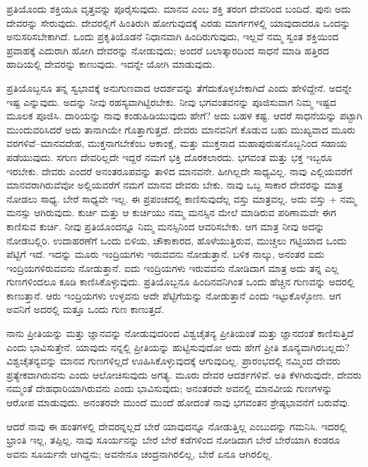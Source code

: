 ಪ್ರತಿಯೊಂದು ಶಕ್ತಿಯೂ ವೃತ್ತವನ್ನು ಪೂರೈಸುವುದು. ಮಾನವ ಎಂಬ ಶಕ್ತಿ ತರಂಗ ದೇವರಿಂದ ಬಂದಿದೆ. ಪುನಃ ಅದು ದೇವರನ್ನು ಸೇರುವುದು. ದೇವರಲ್ಲಿಗೆ ಹಿಂತಿರುಗಿ ಹೋಗುವುದಕ್ಕೆ ಎರಡು ಮಾರ್ಗಗಳಲ್ಲಿ ಯಾವುದಾದರೂ ಒಂದನ್ನು ಅನುಸರಿಸಬೇಕಾಗಿದೆ. ಒಂದು ಪ್ರಕೃತಿಯೊಡನೆ ನಿಧಾನವಾಗಿ ಹಿಂದಿರುಗುವುದು, ಇಲ್ಲವೆ ನಮ್ಮ ಸ್ವಂತ ಶಕ್ತಿಯಿಂದ ಪ್ರವಾಹಕ್ಕೆ ಎದುರಾಗಿ ಹೋಗಿ ದೇವರನ್ನು ನೋಡುವುದು; ಅಂದರೆ ಬಲಾತ್ಕಾರದಿಂದ ಸಾಧನೆ ಮಾಡಿ ಹತ್ತಿರದ ಹಾದಿಯಲ್ಲಿ ದೇವರನ್ನು ಕಾಣುವುದು. ಇದನ್ನೇ ಯೋಗಿ ಮಾಡುವುದು.

ಪ್ರತಿಯೊಬ್ಬನೂ ತನ್ನ ಸ್ವಭಾವಕ್ಕೆ ಅನುಗುಣವಾದ ಆದರ್ಶವನ್ನು ತೆಗೆದುಕೊಳ್ಳಬೇಕಾಗಿದೆ ಎಂದು ಹೇಳಿದ್ದೇನೆ. ಅದನ್ನೇ ಇಷ್ಟ ಎನ್ನುವುದು. ಅದನ್ನು ನೀವು ರಹಸ್ಯವಾಗಿಟ್ಟಿರಬೇಕು. ನೀವು ಭಗವಂತವನನ್ನು ಪೂಜಿಸುವಾಗ ನಿಮ್ಮ ಇಷ್ಟದ ಮೂಲಕ ಪೂಜಿಸಿ. ದಾರಿಯನ್ನು ನಾವು ಕಂಡುಹಿಡಿಯುವುದು ಹೇಗೆ? ಅದು ಬಹಳ ಕಷ್ಟ. ಆದರೆ ಸಾಧನೆಯನ್ನು ಪಟ್ಟಾಗಿ ಮುಂದುವರಿಸಿದರೆ ಅದು ತಾನಾಗಿಯೇ ಗೊತ್ತಾಗುತ್ತದೆ. ದೇವರು ಮಾನವನಿಗೆ ಕೊಡುವ ಬಹು ಮುಖ್ಯವಾದ ಮೂರು ವರಗಳಿವೆ–ಮಾನವದೇಹ, ಮುಕ್ತನಾಗಬೇಕೆಂಬ ಆಕಾಂಕ್ಷೆ, ಮತ್ತು ಮುಕ್ತನಾದ ಮಹಾಪುರುಷನೊಬ್ಬನಿಂದ ಸಹಾಯ ಪಡೆಯುವುದು. ಸಗುಣ ದೇವರಿಲ್ಲದೇ ಇದ್ದರೆ ನಮಗೆ ಭಕ್ತಿ ದೊರಕಲಾರದು. ಭಗವಂತ ಮತ್ತು ಭಕ್ತ ಇಬ್ಬರೂ ಇರಬೇಕು. ದೇವರು ಎಂದರೆ ಅನಂತರೂಪವನ್ನು ತಾಳಿದ ಮಾನವನೇ. ಹೀಗಿಲ್ಲದೇ ಸಾಧ್ಯವಿಲ್ಲ. ನಾವು ಎಲ್ಲಿಯವರೆಗೆ ಮಾನವರಾಗಿರುವೆವೋ ಅಲ್ಲಿಯವರೆಗೆ ನಮಗೆ ಮಾನವ ದೇವರು ಬೇಕು. ನಾವು ಒಬ್ಬ ಸಾಕಾರ ದೇವರನ್ನು ಮಾತ್ರ ನೋಡಲು ಸಾಧ್ಯ. ಬೇರೆ ಸಾಧ್ಯವೇ ಇಲ್ಲ. ಈ ಪ್ರಪಂಚದಲ್ಲಿ ಕಾಣಿಸುವುದೆಲ್ಲ ವಸ್ತು ಮಾತ್ರವಲ್ಲ. ಅದು ವಸ್ತು + ನಮ್ಮ ಮನಸ್ಸು ಆಗಿರುವುದು. ಕುರ್ಚಿ ಮತ್ತು ಆ ಕುರ್ಚಿಯು ನಮ್ಮ ಮನಸ್ಸಿನ ಮೇಲೆ ಮಾಡಿರುವ ಪರಿಣಾಮವೇ ಈಗ ಕಾಣಿಸುವ ಕುರ್ಚಿ. ನೀವು ಪ್ರತಿಯೊಂದನ್ನೂ ನಿಮ್ಮ ಮನಸ್ಸಿನಿಂದ ಆವರಿಸಬೇಕು. ಆಗ ಮಾತ್ರ ನೀವು ಅದನ್ನು ನೋಡಬಲ್ಲಿರಿ. ಉದಾಹರಣೆಗೆ ಒಂದು ಬಿಳಿಯ, ಚೌಕಾಕಾರದ, ಹೊಳೆಯುತ್ತಿರುವ, ಮುಚ್ಚಲು ಗಟ್ಟಿಯಾದ ಒಂದು ಪೆಟ್ಟಿಗೆ ಇದೆ. ಇದನ್ನು ಮೂರು ಇಂದ್ರಿಯಗಳು ಇರುವವನು ನೋಡುತ್ತಾನೆ. ಬಳಿಕ ನಾಲ್ಕು, ಅನಂತರ ಐದು ಇಂದ್ರಿಯಗಳಿರುವವನು ನೋಡುತ್ತಾನೆ. ಐದು ಇಂದ್ರಿಯಗಳು ಇರುವವನು ನೋಡಿದಾಗ ಮಾತ್ರ ಅದು ತನ್ನ ಎಲ್ಲ ಗುಣಗಳಿಂದಲೂ ಕೂಡಿ ಕಾಣಿಸಿಕೊಳ್ಳುವುದು. ಪ್ರತಿಯೊಬ್ಬನೂ ಹಿಂದಿನವನಿಗಿಂತ ಒಂದು ಹೆಚ್ಚಿನ ಗುಣವನ್ನು ಅದರಲ್ಲಿ ಕಾಣುತ್ತಾನೆ. ಆರು ಇಂದ್ರಿಯಗಳು ಉಳ್ಳವನು ಅದೇ ಪೆಟ್ಟಿಗೆಯನ್ನು ನೋಡುತ್ತಾನೆ ಎಂದು ಇಟ್ಟುಕೊಳ್ಳೋಣ. ಆಗ ಅವನಿಗೆ ಅದರಲ್ಲಿ ಮತ್ತೂ ಒಂದು ಗುಣ ಕಾಣುತ್ತದೆ.

ನಾನು ಪ್ರೀತಿಯನ್ನು ಮತ್ತು ಜ್ಞಾನವನ್ನು ನೋಡುವುದರಿಂದ ವಿಶ್ವಚೈತನ್ಯ ಪ್ರೀತಿಯಂತೆ ಮತ್ತು ಜ್ಞಾನದಂತೆ ಕಾಣಿಸುತ್ತಿದೆ ಎಂದು ಭಾವಿಸುತ್ತೇನೆ. ಯಾವುದು ನನ್ನಲ್ಲಿ ಪ್ರೀತಿಯನ್ನು ಹುಟ್ಟಿಸುವುದೋ ಅದು ಹೇಗೆ ಪ್ರೀತಿ ಶೂನ್ಯವಾಗಿರಬಲ್ಲದು? ವಿಶ್ವಚೈತನ್ಯವನ್ನು ಮಾನವ ಗುಣಗಳಿಲ್ಲದೆ ಊಹಿಸಿಕೊಳ್ಳುವುದಕ್ಕೆ ಆಗುವುದಿಲ್ಲ. ಪ್ರಾರಂಭದಲ್ಲಿ ನಮ್ಮಿಂದ ದೇವರು ಪ್ರತ್ಯೇಕವಾಗಿರುವನು ಎಂದು ಆಲೋಚಿಸುವುದು ಅಗತ್ಯ. ಮೂರು ದೇವರ ಆದರ್ಶಗಳಿವೆ. ಅತಿ ಕೆಳಗಿರುವುದೇ, ದೇವರು ನಮ್ಮಂತೆ ದೇಹಧಾರಿಯಾಗಿರುವನು ಎಂದು ಭಾವಿಸುವುದು; ಅನಂತರವೇ ಅವನಲ್ಲಿ ಮಾನವೀಯ ಗುಣಗಳನ್ನು ಆರೋಪ ಮಾಡುವುದು. ಅನಂತರವೇ ಮುಂದೆ ಮುಂದೆ ಹೋದಂತೆ ನಾವು ಭಗವಂತನ ಶ್ರೇಷ್ಠಭಾವನೆಗೆ ಬರುವೆವು.

ಆದರೆ ನಾವು ಈ ಹಂತಗಳಲ್ಲಿ ದೇವರನ್ನಲ್ಲದೆ ಬೇರೆ ಯಾವುದನ್ನೂ ನೋಡುತ್ತಿಲ್ಲ ಎಂಬುದನ್ನು ಗಮನಿಸಿ. ಇದರಲ್ಲಿ ಭ್ರಾಂತಿ ಇಲ್ಲ, ತಪ್ಪಿಲ್ಲ. ನಾವು ಸೂರ್ಯನನ್ನು ಬೇರೆ ಬೇರೆ ಕಡೆಗಳಿಂದ ನೋಡಿದಾಗ ಬೇರೆ ಬೇರೆಯಾಗಿ ಕಂಡರೂ ಅವನು ಸೂರ್ಯನೇ ಆಗಿದ್ದನು; ಅವನೇನೂ ಚಂದ್ರನಾಗಿರಲಿಲ್ಲ, ಬೇರೆ ಏನೂ ಆಗಿರಲಿಲ್ಲ.

